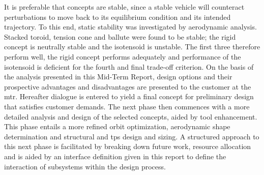 \newline
It is preferable that concepts are stable, since a stable vehicle will counteract perturbations to move back to its equilibrium condition and its intended trajectory. To this end, static stability was investigated by aerodynamic analysis. Stacked toroid, tension cone and ballute were found to be stable; the rigid concept is neutrally stable and the isotensoid is unstable. The first three therefore perform well, the rigid concept performs adequately and performance of the isotensoid is deficient for the fourth and final trade-off criterion.
\newline
\newline
On the basis of the analysis presented in this Mid-Term Report, design options and their prospective advantages and disadvantages are presented to the customer at the \gls{mtr}. Hereafter dialogue is entered to yield a final concept for preliminary design that satisfies customer demands. The next phase then commences with a more detailed analysis and design of the selected concepts, aided by tool enhancement. This phase entails a more refined orbit optimization, aerodynamic shape determination and structural and \gls{tps} design and sizing. A structured approach to this next phase is facilitated by breaking down future work, resource allocation and is aided by an interface definition given in this report to define the interaction of subsystems within the design process.
